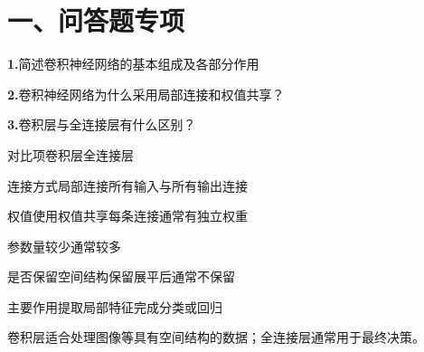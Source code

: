 \documentclass[UTF8,openany,oneside,zihao=-4,fontset=windows]{ctexbook}
\newif\ifshowsolutions
\newcommand{\Question}[2]{%
  \par\Needspace{4\baselineskip}\medskip
  \noindent\textbf{\color{MVBlue}#1}\quad #2\par
}
\newenvironment{AnswerBox}{\begin{tcolorbox}[breakable,colback=MVLight,colframe=MVBlue!45,title={参考答案},fonttitle=\bfseries,boxrule=0.55pt,arc=1.5mm,left=2mm,right=2mm,top=1.5mm,bottom=1.5mm]}{\end{tcolorbox}}
\newcommand{\PracticeSpace}[1]{\ifshowsolutions\else\par\vspace{#1}\par\fi}
\begin{document}
\section{一、问答题专项}
\Question{1.}{简述卷积神经网络的基本组成及各部分作用}
\ifshowsolutions
\begin{AnswerBox}
\par\noindent\textbf{卷积神经网络通常由以下部分组成：}
\par 卷积层：通过卷积核提取局部特征，例如边缘、纹理和高级语义特征。
\par 激活函数：引入非线性，使网络能够学习复杂映射，常用ReLU。
\par 池化层：降低特征图空间尺寸，减少计算量，提高对局部位移的鲁棒性。
\par 归一化层：稳定特征分布，加快网络训练，例如Batch Normalization。
\par 全连接层：将提取的特征映射为最终类别或回归结果。
\par 输出层：根据任务输出类别概率、边界框或像素分类结果。
\end{AnswerBox}
\else
\PracticeSpace{2.4cm}
\fi
\Question{2.}{卷积神经网络为什么采用局部连接和权值共享？}
\ifshowsolutions
\begin{AnswerBox}
\par 局部连接是指一个输出神经元只与输入图像的局部区域连接，符合图像局部像素相关性较强的特点。
\par 权值共享是指同一个卷积核在整幅图像上重复使用，使其能够在不同位置检测同一种特征。
\par\noindent\textbf{二者的作用是：}
\par\noindent\textbullet\quad 大幅减少参数量；
\par\noindent\textbullet\quad 降低计算复杂度；
\par\noindent\textbullet\quad 能够检测不同位置的相同特征；
\par 使卷积具有一定的平移等变性。
\end{AnswerBox}
\else
\PracticeSpace{2.4cm}
\fi
\Question{3.}{卷积层与全连接层有什么区别？}
\ifshowsolutions
\begin{AnswerBox}
\par 对比项\quad 卷积层\quad 全连接层
\par 连接方式\quad 局部连接\quad 所有输入与所有输出连接
\par 权值使用\quad 权值共享\quad 每条连接通常有独立权重
\par 参数量\quad 较少\quad 通常较多
\par 是否保留空间结构\quad 保留\quad 展平后通常不保留
\par 主要作用\quad 提取局部特征\quad 完成分类或回归
\par 卷积层适合处理图像等具有空间结构的数据；全连接层通常用于最终决策。
\end{AnswerBox}
\end{document}
